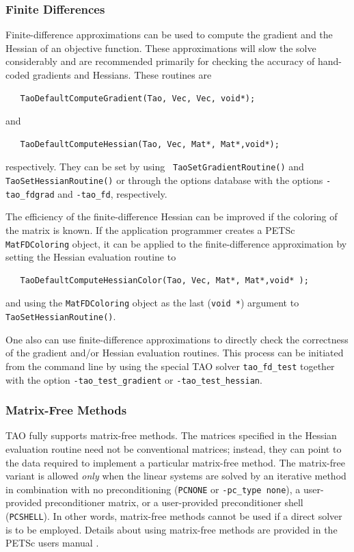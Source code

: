 \documentclass[]{book}
\begin{document}
\subsubsection{Finite Differences} %
Finite-difference approximations can be used to compute the gradient and the
Hessian of an objective
function.  These approximations will slow the solve considerably and 
are recommended primarily  
for checking the accuracy of hand-coded gradients and Hessians.
These routines are
\begin{verbatim}
   TaoDefaultComputeGradient(Tao, Vec, Vec, void*);
\end{verbatim}
and 
\begin{verbatim}
   TaoDefaultComputeHessian(Tao, Vec, Mat*, Mat*,void*);
\end{verbatim}
respectively. They can be set by using {\tt
TaoSetGradientRoutine()} and 
{\tt TaoSetHessianRoutine()} or through the options database with the
options {\tt -tao\_fdgrad} and {\tt -tao\_fd}, respectively.

The efficiency of the finite-difference Hessian can be improved if the
coloring of the matrix is known.  If the application programmer creates
a PETSc {\tt MatFDColoring} object, it can be applied to the finite-difference
approximation by setting the Hessian evaluation routine to
\begin{verbatim}
   TaoDefaultComputeHessianColor(Tao, Vec, Mat*, Mat*,void* );
\end{verbatim}
and using the {\tt MatFDColoring} object as
the last ({\tt void *}) argument to {\tt TaoSetHessianRoutine()}.

One also can use finite-difference approximations to directly check
the correctness of the gradient and/or Hessian evaluation routines.
This process can be initiated from the command line by using the special 
TAO solver 
{\tt tao\_fd\_test} together with the option
{\tt -tao\_test\_gradient} or {\tt -tao\_test\_hessian}.

\subsubsection{Matrix-Free Methods}
TAO fully supports matrix-free methods. The matrices specified in the
Hessian evaluation routine need not be conventional
matrices; instead, they can point to the data required to implement a
particular matrix-free method.  The matrix-free variant is allowed
{\em only} when the linear systems are solved by an iterative method
in combination with no preconditioning ({\tt PCNONE} or {\tt -pc\_type none}),
a user-provided preconditioner matrix, or a user-provided preconditioner
shell ({\tt PCSHELL}). In other words,
matrix-free methods cannot be used if a direct solver is to 
be employed. %
Details about using matrix-free methods are provided in the
PETSc users manual \cite{petsc-user-ref}.
\end{document}
